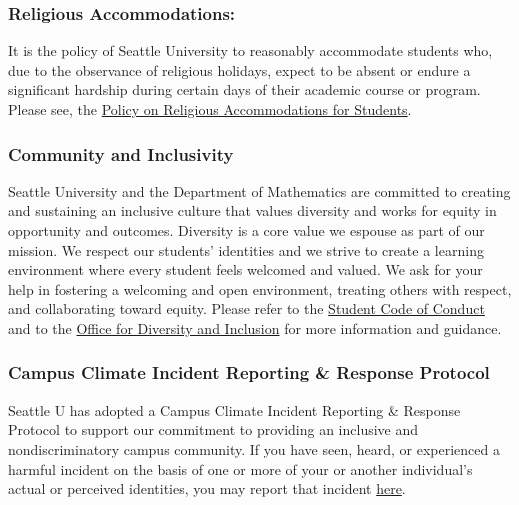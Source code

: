 \documentclass[16pt]{article}
\begin{document}
	\subsubsection*{Religious Accommodations:} It is the policy of Seattle University to reasonably accommodate students who, due to the observance of religious holidays, expect to be absent or endure a significant hardship during certain days of their academic course or program. Please see, the \href{https://bit.ly/2kCTmnL}{Policy on Religious Accommodations for Students}.
	\subsubsection*{Community and Inclusivity}
	Seattle University and the Department of Mathematics are committed to creating and sustaining an inclusive culture that values diversity and works for equity in opportunity and outcomes. Diversity is a core value we espouse as part of our mission.  We respect our students' identities and we strive to create a learning environment where every student feels welcomed and valued. We ask for your help in fostering a welcoming and open environment, treating others with respect, and collaborating toward equity. Please refer to the \href{https://www.seattleu.edu/media/dean-of-students/files/Code-2023-24.pdf}{Student Code of Conduct} and to the \href{https://www.seattleu.edu/diversity/}{Office for Diversity and Inclusion} for more information and guidance. 
	\subsubsection*{Campus Climate Incident Reporting \& Response Protocol}
	Seattle U has adopted a Campus Climate Incident Reporting \& Response Protocol to support our commitment to providing an inclusive and nondiscriminatory campus community. If you have seen, heard, or experienced a harmful incident on the basis of one or more of your or another individual’s actual or perceived identities, you may report that incident \href{https://www.seattleu.edu/equity/campus-climate-incidents}{here}. 
	
\end{document}
